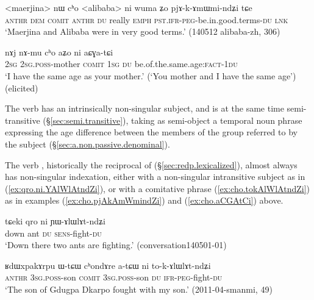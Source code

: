 \begin{exe}
\ex   \label{ex:cho.pjAkAmWmindZi}
 \gll  <maerjina> nɯ cʰo <alibaba> ni wuma ʑo pjɤ-k-ɤmɯmi-ndʑi tɕe \\
\textsc{anthr} \textsc{dem} \textsc{comit}  \textsc{anthr} \textsc{du} really \textsc{emph} \textsc{pst}.\textsc{ifr}-\textsc{peg}-be.in.good.terms-\textsc{du} \textsc{lnk} \\
\glt `Maerjina and Alibaba were in very good terms.' (140512 alibaba-zh, 306)
\end{exe}

\begin{exe}
\ex   \label{ex:cho.aCGAtCi}
 \gll  nɤj nɤ-mu cʰo aʑo ni aɕɣa-tɕi \\
 \textsc{2sg} \textsc{2sg}.\textsc{poss}-mother \textsc{comit} \textsc{1sg} \textsc{du} be.of.the.same.age:\textsc{fact}-\textsc{1du} \\
 \glt `I have the same age as your mother.' (`You mother and I have the same age') (elicited)
\end{exe} 

The verb  has an intrinsically non-singular subject, and is at the same time semi-transitive (§\ref{sec:semi.transitive}), taking as semi-object a temporal noun phrase expressing the age difference between the members of the group referred to by the subject (§\ref{sec:a.non.passive.denominal}).
 
The verb , historically the reciprocal of  (§\ref{sec:redp.lexicalized}), almost always has non-singular indexation, either with a non-singular intransitive subject as in (\ref{ex:qro.ni.YAlWlAtndZi}), or with a comitative phrase (\ref{ex:cho.tokAlWlAtndZi}) as in examples (\ref{ex:cho.pjAkAmWmindZi}) and (\ref{ex:cho.aCGAtCi}) above.

\begin{exe}
\ex   \label{ex:qro.ni.YAlWlAtndZi}
 \gll  tɕeki qro ni ɲɯ-ɤlɯlɤt-ndʑi \\
 down ant \textsc{du} \textsc{sens}-fight-\textsc{du} \\
\glt `Down there two ants are fighting.' (conversation140501-01)
\end{exe}

\begin{exe}
	\ex   \label{ex:cho.tokAlWlAtndZi}
	\gll ʁdɯxpakɤrpu ɯ-tɕɯ cʰondɤre a-tɕɯ ni to-k-ɤlɯlɤt-ndʑi \\
	\textsc{anthr} \textsc{3sg}.\textsc{poss}-son \textsc{comit}  \textsc{3sg}.\textsc{poss}-son \textsc{du} \textsc{ifr}-\textsc{peg}-fight-\textsc{du} \\
	\glt `The son of Gdugpa Dkarpo fought with my son.' (2011-04-smanmi, 49)
\end{exe}


